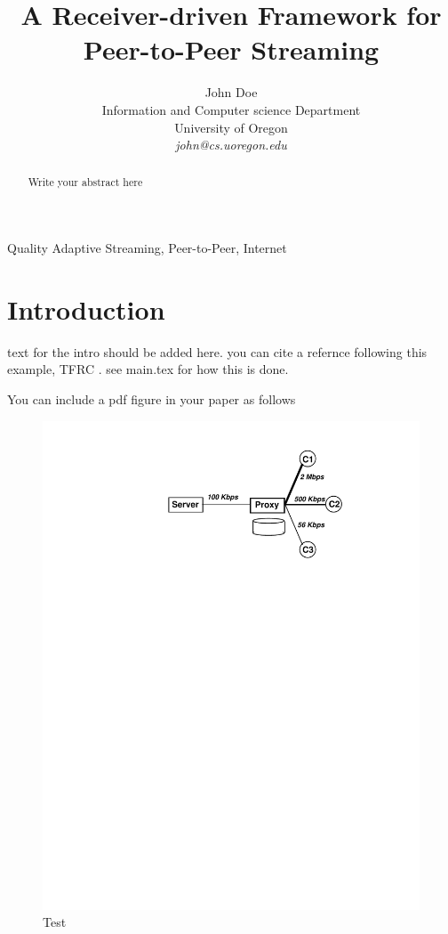 \documentclass[12pt,twocolumn]{IEEEtran11}
\begin{document}


\title{\Large \bf A Receiver-driven Framework for Peer-to-Peer Streaming
}
\author{
John Doe\\
Information and Computer science Department\\
University of Oregon\\
{\em john@cs.uoregon.edu}
}
\maketitle
\begin{abstract}
Write your abstract here
\end{abstract}

\begin{keywords} 
Quality Adaptive Streaming, Peer-to-Peer, Internet
\end{keywords}

\section{Introduction}
\label{sec:intro}
%
text for the intro should be added here. 
you can cite a refernce following this example,
TFRC \cite{Floyd:SIGCOMM00}. see main.tex for how this is done.

You can include a pdf figure in your paper as follows
\begin{figure}[t]
\centering
\includegraphics[width=1.0\textwidth]{mc.pdf}
\caption{Test}
\end{figure}
\end{document}
